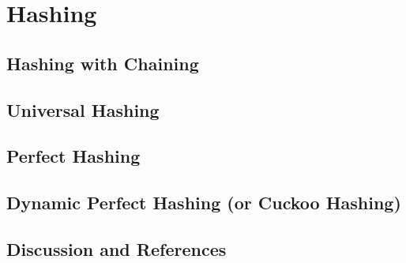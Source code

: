 \chapter{Hashing}
\section{Hashing with Chaining}
\section{Universal Hashing}
\section{Perfect Hashing}
\section{Dynamic Perfect Hashing (or Cuckoo Hashing)}
\section{Discussion and References}

